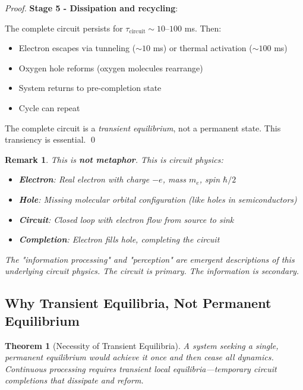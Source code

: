 \documentclass[12pt,a4paper]{article}
\newtheorem{theorem}{Theorem}
\newtheorem{remark}{Remark}
\begin{document}
\begin{proof}
\textbf{Stage 5 - Dissipation and recycling}:

The complete circuit persists for $\tau_{\text{circuit}} \sim 10$--$100$ ms. Then:
\begin{itemize}
\item Electron escapes via tunneling ($\sim 10$ ms) or thermal activation ($\sim 100$ ms)
\item Oxygen hole reforms (oxygen molecules rearrange)
\item System returns to pre-completion state
\item Cycle can repeat
\end{itemize}

The complete circuit is a \textit{transient equilibrium}, not a permanent state. This transiency is essential. \qed
\end{proof}

\begin{remark}
This is \textbf{not metaphor}. This is circuit physics:

\begin{itemize}
\item \textbf{Electron}: Real electron with charge $-e$, mass $m_e$, spin $\hbar/2$
\item \textbf{Hole}: Missing molecular orbital configuration (like holes in semiconductors)
\item \textbf{Circuit}: Closed loop with electron flow from source to sink
\item \textbf{Completion}: Electron fills hole, completing the circuit
\end{itemize}

The "information processing" and "perception" are \textit{emergent descriptions} of this underlying circuit physics. The circuit is primary. The information is secondary.
\end{remark}

\subsection{Why Transient Equilibria, Not Permanent Equilibrium}

\begin{theorem}[Necessity of Transient Equilibria]
\label{thm:transient_necessity}
A system seeking a single, permanent equilibrium would achieve it once and then cease all dynamics. Continuous processing requires \textit{transient local equilibria}—temporary circuit completions that dissipate and reform.
\end{theorem}
\end{document}
